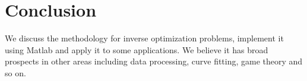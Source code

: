 \section{Conclusion}\label{sec:conclusion}

We discuss the methodology for inverse optimization problems, implement it using Matlab and apply it to some applications. We believe it has broad prospects in other areas including data processing, curve fitting, game theory and so on.
